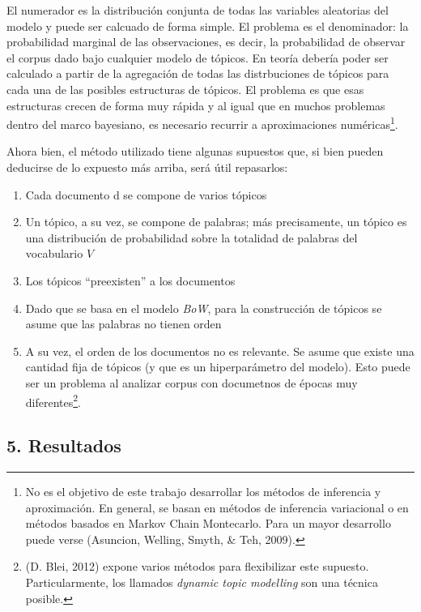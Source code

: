 \documentclass[]{article}
\providecommand{\tightlist}{%
  \setlength{\itemsep}{0pt}\setlength{\parskip}{0pt}}
\let\rmarkdownfootnote\footnote%
\def\footnote{\protect\rmarkdownfootnote}
\begin{document}
El numerador es la distribución conjunta de todas las variables
aleatorias del modelo y puede ser calcuado de forma simple. El problema
es el denominador: la probabilidad marginal de las observaciones, es
decir, la probabilidad de observar el corpus dado bajo cualquier modelo
de tópicos. En teoría debería poder ser calculado a partir de la
agregación de todas las distrbuciones de tópicos para cada una de las
posibles estructuras de tópicos. El problema es que esas estructuras
crecen de forma muy rápida y al igual que en muchos problemas dentro del
marco bayesiano, es necesario recurrir a aproximaciones
numéricas\footnote{No es el objetivo de este trabajo desarrollar los
  métodos de inferencia y aproximación. En general, se basan en métodos
  de inferencia variacional o en métodos basados en Markov Chain
  Montecarlo. Para un mayor desarrollo puede verse (Asuncion, Welling,
  Smyth, \& Teh, 2009).}.

Ahora bien, el método utilizado tiene algunas supuestos que, si bien
pueden deducirse de lo expuesto más arriba, será útil repasarlos:

\begin{enumerate}
\def\labelenumi{\arabic{enumi}.}
\tightlist
\item
  Cada documento d se compone de varios tópicos
\item
  Un tópico, a su vez, se compone de palabras; más precisamente, un
  tópico es una distribución de probabilidad sobre la totalidad de
  palabras del vocabulario \(V\)
\item
  Los tópicos ``preexisten'' a los documentos
\item
  Dado que se basa en el modelo \emph{BoW}, para la construcción de
  tópicos se asume que las palabras no tienen orden
\item
  A su vez, el orden de los documentos no es relevante. Se asume que
  existe una cantidad fija de tópicos (y que es un hiperparámetro del
  modelo). Esto puede ser un problema al analizar corpus con documetnos
  de épocas muy diferentes\footnote{(D. Blei, 2012) expone varios
    métodos para flexibilizar este supuesto. Particularmente, los
    llamados \emph{dynamic topic modelling} son una técnica posible.}.
\end{enumerate}

\subsection{5. Resultados}\label{resultados}
\end{document}

